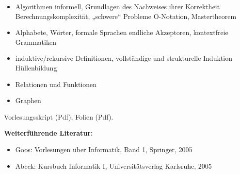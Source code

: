 \begin{course}
\begin{content}
\begin{itemize}\item Algorithmen informell, Grundlagen des Nachweises ihrer Korrektheit\newline
Berechnungskomplexität, „schwere“ Probleme\newline
O-Notation, Mastertheorem  \item Alphabete, Wörter, formale Sprachen\newline
endliche Akzeptoren, kontextfreie Grammatiken  \item induktive/rekursive Definitionen, vollständige und strukturelle Induktion\newline
Hüllenbildung  \item Relationen und Funktionen  \item Graphen  \end{itemize}
\end{content}

\begin{media}Vorlesungsskript (Pdf), Folien (Pdf).

\end{media}

\begin{literature}\textbf{Weiterführende Literatur:}

 \begin{itemize}\item Goos: Vorlesungen über Informatik, Band 1, Springer, 2005  \item Abeck: Kursbuch Informatik I, Universitätsverlag Karlsruhe, 2005  \end{itemize}\end{literature}



\end{course}